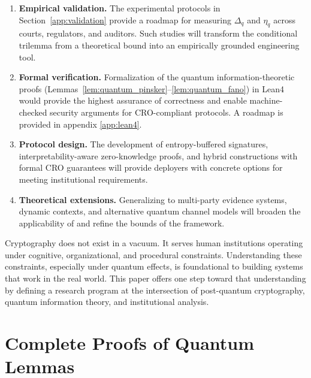 \documentclass{ieeeaccess}
\begin{document}
\begin{enumerate}
    \item \textbf{Empirical validation.} The experimental protocols in 
    Section~\ref{app:validation} provide a roadmap for measuring $\Delta_q$ and 
    $\eta_q$ across courts, regulators, and auditors. Such studies will transform 
    the conditional trilemma from a theoretical bound into an empirically grounded 
    engineering tool.
    
    \item \textbf{Formal verification.} Formalization of the quantum 
    information-theoretic proofs (Lemmas~\ref{lem:quantum_pinsker}--\ref{lem:quantum_fano}) 
    in Lean4 would provide the highest assurance of correctness and enable machine-checked 
    security arguments for CRO-compliant protocols. A roadmap is provided in appendix \ref{app:lean4}.
    
    \item \textbf{Protocol design.} The development of entropy-buffered signatures, 
    interpretability-aware zero-knowledge proofs, and hybrid constructions with 
    formal CRO guarantees will provide deployers with concrete options for meeting 
    institutional requirements.
    
    \item \textbf{Theoretical extensions.} Generalizing to multi-party evidence 
    systems, dynamic contexts, and alternative quantum channel models will broaden 
    the applicability of and refine the bounds of the framework.
\end{enumerate}

Cryptography does not exist in a vacuum. It serves human institutions operating 
under cognitive, organizational, and procedural constraints. Understanding these 
constraints, especially under quantum effects, is foundational to building systems 
that work in the real world. This paper offers one step toward that understanding by 
defining a research program at the intersection of post-quantum cryptography, 
quantum information theory, and institutional analysis.
\appendix

\section{Complete Proofs of Quantum Lemmas}
\end{document}
